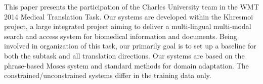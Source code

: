 This paper presents the participation of the Charles University team in the WMT 2014 Medical Translation Task. Our systems are developed within the Khresmoi project, a large integrated project aiming to deliver a multi-lingual multi-modal search and access system for biomedical information and documents. Being involved in organization of this task, our primarily goal is to set up a baseline for both the subtask and all translation directions. Our systems are based on the phrase-based Moses system and standard methods for domain adaptation. The constrained/unconstrained systems differ in the training data only.

